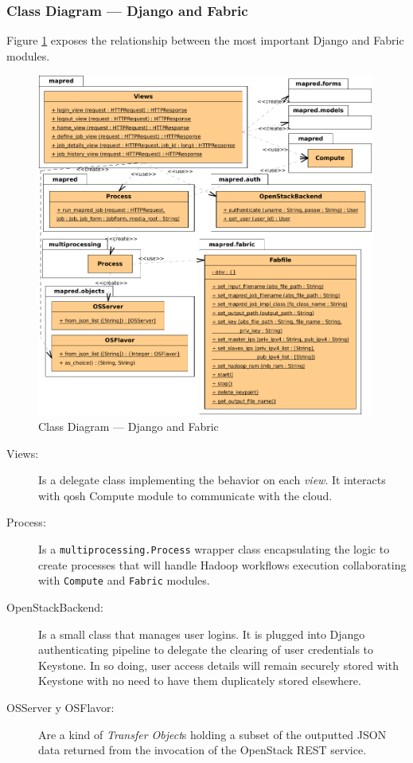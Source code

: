 \subsubsection{Class Diagram --- Django and Fabric}\label{subsubsec:clasesdjangofabric}
\noindent Figure \ref{fig:djangoyfabric} exposes the relationship between the most important Django and Fabric modules.

\begin{figure}[tbp]
\begin{center}
\includegraphics[width=0.99\textwidth]{imagenes/029.pdf}
 \caption{Class Diagram --- Django and Fabric}
\label{fig:djangoyfabric}
\end{center}
\end{figure}

\begin{description}
 \item[Views:] Is a delegate class implementing the behavior on each \emph{view}. It interacts with qosh Compute module to communicate with the cloud.
 \item[Process:] Is a \texttt{multiprocessing.Process} wrapper class encapsulating the logic to create processes that will handle Hadoop workflows execution collaborating with \texttt{Compute} and \texttt{Fabric} modules.
 \item[OpenStackBackend:] Is a small class that manages user logins. It is plugged into Django authenticating pipeline to delegate the clearing of user credentials to Keystone. In so doing, user access details will remain securely stored with Keystone with no need to have them duplicately stored elsewhere.
 \item[OSServer y OSFlavor:] Are a kind of \emph{Transfer Object}s holding a subset of the outputted JSON data returned from the invocation of the OpenStack REST service.
\end{description}

